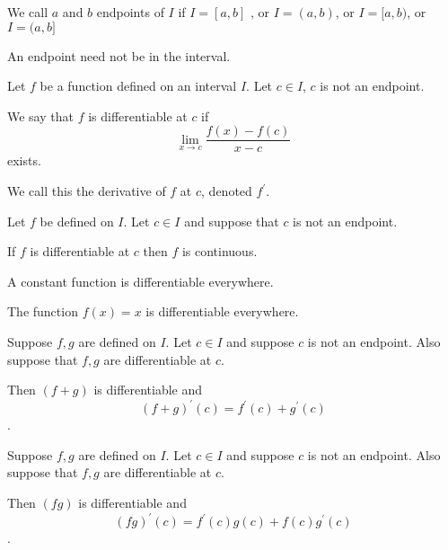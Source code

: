 
\begin{defn}[Endpoint]
    We call $a$ and $b$ endpoints of $I$ if $I = [a,b]$ , or $I = (a,b)$,
    or $I = [a,b)$, or $I = (a,b]$

    An endpoint need not be in the interval.
\end{defn}


\begin{defn}[Derivative]
    Let $f$ be a function defined on an interval $I$. Let $c\in I$, $c$ is not 
    an endpoint.

    We say that $f$ is differentiable at $c$ if 
    \[\lim_{x \to c} \frac{f(x) - f(c)}{x-c}\]
    exists.

    We call this the derivative of $f$ at $c$, denoted $f^\prime$.
\end{defn}


\begin{prop}
    Let $f$ be defined on $I$. Let $c \in I$ and suppose that $c$ is not an endpoint.

    If $f$ is differentiable at $c$ then $f$ is continuous.
\end{prop}


\begin{prop}
    A constant function is differentiable everywhere.
\end{prop}


\begin{prop}
    The function $f(x)=x$ is differentiable everywhere.
\end{prop}


\begin{prop}
    Suppose $f,g$ are defined on $I$. Let $c\in I$ and suppose $c$ is not an endpoint.
    Also suppose that $f,g$ are differentiable at $c$.

    Then $(f+g)$ is differentiable and
    \[(f+g)^\prime(c) = f^\prime(c) + g^\prime(c)\].  
\end{prop}


\begin{prop}
    Suppose $f,g$ are defined on $I$. Let $c\in I$ and suppose $c$ is not an endpoint.
    Also suppose that $f,g$ are differentiable at $c$.

    Then $(fg)$ is differentiable and
    \[(fg)^\prime(c) = f^\prime(c)g(c) + f(c)g^\prime(c)\].  
\end{prop}


